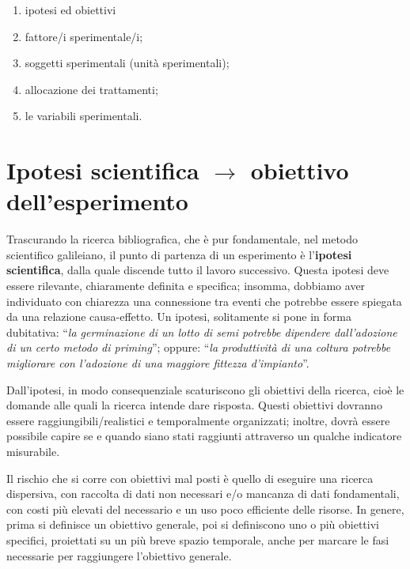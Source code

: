 \documentclass[a4paper,12pt,oneside]{book}
\providecommand{\tightlist}{%
  \setlength{\itemsep}{0pt}\setlength{\parskip}{0pt}}
\begin{document}
\begin{enumerate}
\def\labelenumi{\arabic{enumi}.}
\tightlist
\item
  ipotesi ed obiettivi
\item
  fattore/i sperimentale/i;
\item
  soggetti sperimentali (unità sperimentali);
\item
  allocazione dei trattamenti;
\item
  le variabili sperimentali.
\end{enumerate}

\hypertarget{ipotesi-scientifica-rightarrow-obiettivo-dellesperimento}{%
\section{\texorpdfstring{Ipotesi scientifica \(\rightarrow\) obiettivo dell'esperimento}{Ipotesi scientifica \textbackslash rightarrow obiettivo dell'esperimento}}\label{ipotesi-scientifica-rightarrow-obiettivo-dellesperimento}}

Trascurando la ricerca bibliografica, che è pur fondamentale, nel metodo scientifico galileiano, il punto di partenza di un esperimento è l'\textbf{ipotesi scientifica}, dalla quale discende tutto il lavoro successivo. Questa ipotesi deve essere rilevante, chiaramente definita e specifica; insomma, dobbiamo aver individuato con chiarezza una connessione tra eventi che potrebbe essere spiegata da una relazione causa-effetto. Un ipotesi, solitamente si pone in forma dubitativa: ``\emph{la germinazione di un lotto di semi potrebbe dipendere dall'adozione di un certo metodo di priming}''; oppure: ``\emph{la produttività di una coltura potrebbe migliorare con l'adozione di una maggiore fittezza d'impianto}''.

Dall'ipotesi, in modo consequenziale scaturiscono gli obiettivi della ricerca, cioè le domande alle quali la ricerca intende dare risposta. Questi obiettivi dovranno essere raggiungibili/realistici e temporalmente organizzati; inoltre, dovrà essere possibile capire se e quando siano stati raggiunti attraverso un qualche indicatore misurabile.

Il rischio che si corre con obiettivi mal posti è quello di eseguire una ricerca dispersiva, con raccolta di dati non necessari e/o mancanza di dati fondamentali, con costi più elevati del necessario e un uso poco efficiente delle risorse. In genere, prima si definisce un obiettivo generale, poi si definiscono uno o più obiettivi specifici, proiettati su un più breve spazio temporale, anche per marcare le fasi necessarie per raggiungere l'obiettivo generale.
\end{document}
